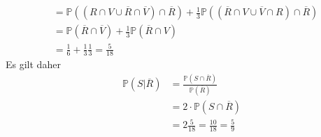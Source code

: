 \documentclass[uebung]{lecture}
\renewcommand{\P}{\mathbb{P}}
\begin{document}
\begin{aufgabe}
\begin{enumerate}[(a)]
\begin{align*}
            &= \P((R \cap V \cup \overline R \cap \overline V) \cap \overline R) + \frac{1}{3}\P((\overline{R} \cap V \cup \overline{V} \cap R) \cap \overline R)\\
            &= \P(\overline R\cap \overline V) + \frac{1}{3} \P(\overline R \cap V)\\
            &= \frac{1}{6} + \frac{1}{3} \frac{1}{3} = \frac{5}{18}
        \end{align*}
        Es gilt daher
        \begin{align*}
            \P(S|\overline R) &= \frac{\P(S\cap \overline R)}{\P(\overline{R})}\\
            &= 2 \cdot \P(S \cap \overline R)\\
            &= 2 \frac{5}{18} = \frac{10}{18} = \frac{5}{9}
        \end{align*}
    \end{enumerate}
\end{aufgabe}
\end{document}
